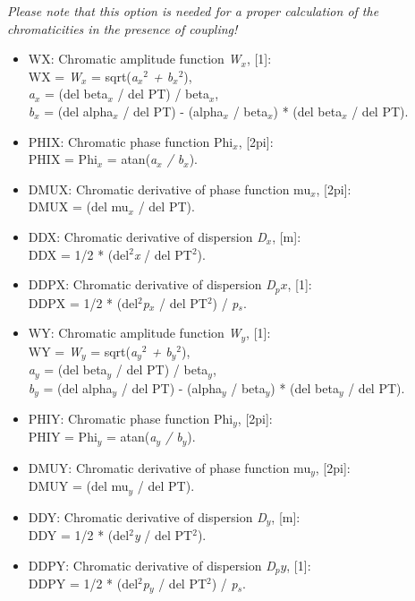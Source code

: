 \textit{Please note that this option is needed for a proper calculation
  of the chromaticities in the presence of coupling!} 
\begin{itemize}
   \item WX: Chromatic amplitude function \textit{W$_x$}, [1]:\\
     WX = \textit{W$_x$} = sqrt(\textit{a$_x$$^2$ + b$_x$$^2$}),\\
     \textit{a$_x$} = (del beta$_\textit{x}$ / del PT) / beta$_\textit{x}$,\\
     \textit{b$_x$} = (del alpha$_\textit{x}$ / del PT) -
     (alpha$_\textit{x}$ / beta$_\textit{x}$) * (del beta$_\textit{x}$ /
     del PT).      
   \item PHIX: Chromatic phase function Phi$_\textit{x}$, [2pi]:\\
     PHIX = Phi$_\textit{x}$ = atan(\textit{a$_x$ / b$_x$}).     
   \item DMUX: Chromatic derivative of phase function mu$_\textit{x}$, [2pi]:\\
     DMUX = (del mu$_\textit{x}$ / del PT).     
   \item DDX: Chromatic derivative of dispersion \textit{D$_x$}, [m]:\\
     DDX = 1/2 * (del$^2$\textit{x} / del PT$^2$).     
   \item DDPX: Chromatic derivative of dispersion \textit{D$_px$}, [1]:\\
     DDPX = 1/2 * (del$^2$\textit{p$_x$} / del PT$^2$) / \textit{p$_s$}.     
   \item WY: Chromatic amplitude function \textit{W$_y$}, [1]:\\
     WY = \textit{W$_y$} = sqrt(\textit{a$_y$$^2$ + b$_y$$^2$}),\\     
     \textit{a$_y$} = (del beta$_\textit{y}$ / del PT) / beta$_\textit{y}$,\\     
     \textit{b$_y$} = (del alpha$_\textit{y}$ / del PT) -
     (alpha$_\textit{y}$ / beta$_\textit{y}$) * (del beta$_\textit{y}$ /
     del PT).     
   \item PHIY: Chromatic phase function Phi$_\textit{y}$, [2pi]:\\     
     PHIY = Phi$_\textit{y}$ = atan(\textit{a$_y$ / b$_y$}).     
   \item DMUY: Chromatic derivative of phase function mu$_\textit{y}$, [2pi]:\\     
     DMUY = (del mu$_\textit{y}$ / del PT).     
   \item DDY: Chromatic derivative of dispersion \textit{D$_y$}, [m]:\\     
     DDY = 1/2 * (del$^2$\textit{y} / del PT$^2$).     
   \item DDPY: Chromatic derivative of dispersion \textit{D$_py$}, [1]:\\ 
     DDPY = 1/2 * (del$^2$\textit{p$_y$} / del PT$^2$) / \textit{p$_s$}.     
\end{itemize}

